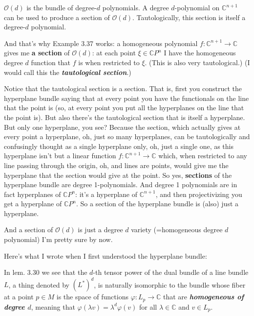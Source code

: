 \begin{upshot}\leavevmode
\(\mathcal{O}(d)\) is the bundle of degree-\(d\) polynomials. A degree \(d\)-polynomial on \(\mathbb{C}^{n+1}\) can be used to produce a section of \(\mathcal{O}(d)\). Tautologically, this section is itself a degree-\(d\) polynomial.
\end{upshot}
And that's why \cite{lec} Example 3.37 works: a homogeneous polynomial \(f: \mathbb{C}^{n+1}\to \mathbb{C}\) gives me \textbf{a section} of \(\mathcal{O}(d)\): at each point \(\xi \in \mathbb{C}P^{n}\) I have the homogeneous degree \(d\) function that \(f\) is when restricted to \(\xi\). (This is also very tautological.) (I would call this the \textit{\textbf{tautological section}}.)

Notice that the tautological section is a section. That is, first you construct the hyperplane bundle saying that at every point you have the functionals on the line that the point is (so, at every point you put all the hyperplanes on the line that the point is). But also there's the tautological section that is itself a hyperplane. But only one hyperplane, you see? Because the section, which actually gives at every point a hyperplane, oh, just so many hyperplanes, can be tautologically and confusingly thought as a single hyperplane only, oh, just a single one, as this hyperplane isn't but a linear function \(f:\mathbb{C}^{n+1}\to \mathbb{C}\) which, when restricted to any line passing through the origin, oh, and lines are points, would give me the hyperplane that the section would give at the point. So yes, \textbf{sections} of the hyperplane bundle are degree 1-polynomials. And degree 1 polynomials are in fact hyperplanes of \(\mathbb{C}P^n\): it's a hyperplane of \(\mathbb{C}^{n+1}\), and then projectivizing you get a hyperplane of \(\mathbb{C}P^n\). So a section of the hyperplane bundle is (also) just a hyperplane.

And a section of \(\mathcal{O}(d)\) is just a degree \(d\) variety (=homogeneous degree \(d\) polynomial) I'm pretty sure by now.


Here's what I wrote when I first understood the hyperplane bundle:

In lem. 3.30 \cite{lec} we see that the $d$-th tensor power of the dual bundle of a line bundle $L$, a thing denoted by $(L^*)^d$, is naturally isomorphic to the bundle whose fiber at a point $p \in M$ is the space of functions $\varphi:L_p\to \mathbb{C}$ that are \textit{\textbf{homogeneous of degree $d$}}, meaning that $\varphi(\lambda v)=\lambda^d \varphi(v)$ for all $\lambda \in \mathbb{C}$ and $v \in L_p$.

